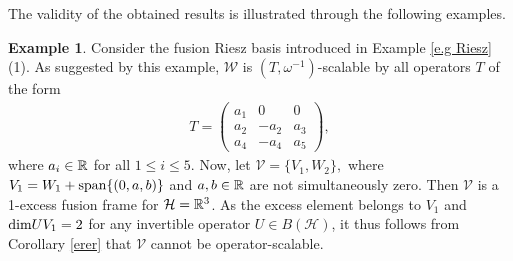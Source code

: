 \documentclass[sn-mathphys-num]{sn-jnl}%
\theoremstyle{definition}
\newtheorem{example}[theorem]{Example}
\theoremstyle{remark}
\numberwithin{equation}{section}
\begin{document}
The validity of the obtained results is illustrated through the following examples.

\begin{example}
Consider the fusion Riesz basis introduced in Example \ref{e.g Riesz}(1). As suggested by this example, $\mathcal{W}$ is $\left( T,\omega^{-1}\right) $-scalable by all operators $T$ of the form 
\begin{align*}
T=\begin{pmatrix}
   a_{1}  & 0 & 0\\
   a_{2}  & -a_{2}  & a_{3} \\
   a_{4}  & -a_{4}  & a_{5} 
\end{pmatrix},
\end{align*}
where $ a_{i}\in \Bbb{R}$ for all $1 \leq i \leq 5.$ Now, let $\mathcal{V}=\lbrace V_{1}, W_{2}\rbrace ,$ where $V_{1}=W_{1}+\textnormal{span}\{(0,a,b)\}$ and $ a,b \in \Bbb{R}$ are not simultaneously zero. Then $\mathcal{V}$ is a 1-excess fusion frame for $\mathcal {H}=\Bbb R^{3} $. As the excess element belongs to $V_{1}$ and $\textnormal{dim}UV_{1}=2$ for any invertible operator $U \in B(\mathcal {H})$, it thus follows from Corollary \ref{erer} that $\mathcal{V}$ cannot be operator-scalable.
\end{example}
\end{document}
